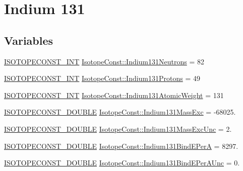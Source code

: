 \hypertarget{group___isotope_const-_indium-_in131}{}\section{Indium 131}
\label{group___isotope_const-_indium-_in131}
\subsection*{Variables}
\begin{DoxyCompactItemize}
\item 
\mbox{\hyperlink{group___isotope_const-_macros_ga5f18360b3e99483a35c32d789e62621c}{I\+S\+O\+T\+O\+P\+E\+C\+O\+N\+S\+T\+\_\+\+I\+NT}} \mbox{\hyperlink{group___isotope_const-_indium-_in131_ga2c5a13fe87f76c489cc000a4b09c2484}{Isotope\+Const\+::\+Indium131\+Neutrons}} = 82
\item 
\mbox{\hyperlink{group___isotope_const-_macros_ga5f18360b3e99483a35c32d789e62621c}{I\+S\+O\+T\+O\+P\+E\+C\+O\+N\+S\+T\+\_\+\+I\+NT}} \mbox{\hyperlink{group___isotope_const-_indium-_in131_gaac49eb7eaf3cd87a3bb5853c2b3e2609}{Isotope\+Const\+::\+Indium131\+Protons}} = 49
\item 
\mbox{\hyperlink{group___isotope_const-_macros_ga5f18360b3e99483a35c32d789e62621c}{I\+S\+O\+T\+O\+P\+E\+C\+O\+N\+S\+T\+\_\+\+I\+NT}} \mbox{\hyperlink{group___isotope_const-_indium-_in131_gaefaeeedf914614a83935a180375c573e}{Isotope\+Const\+::\+Indium131\+Atomic\+Weight}} = 131
\item 
\mbox{\hyperlink{group___isotope_const-_macros_ga8f45a7272ce02c0b4c65c44636ed719a}{I\+S\+O\+T\+O\+P\+E\+C\+O\+N\+S\+T\+\_\+\+D\+O\+U\+B\+LE}} \mbox{\hyperlink{group___isotope_const-_indium-_in131_ga5d6dfdd2ffacc1f60cddfd1ef940777c}{Isotope\+Const\+::\+Indium131\+Mass\+Exc}} = -\/68025.
\item 
\mbox{\hyperlink{group___isotope_const-_macros_ga8f45a7272ce02c0b4c65c44636ed719a}{I\+S\+O\+T\+O\+P\+E\+C\+O\+N\+S\+T\+\_\+\+D\+O\+U\+B\+LE}} \mbox{\hyperlink{group___isotope_const-_indium-_in131_ga4c2b98b7137a4b9ff07d3a1d0dfb30a7}{Isotope\+Const\+::\+Indium131\+Mass\+Exc\+Unc}} = 2.
\item 
\mbox{\hyperlink{group___isotope_const-_macros_ga8f45a7272ce02c0b4c65c44636ed719a}{I\+S\+O\+T\+O\+P\+E\+C\+O\+N\+S\+T\+\_\+\+D\+O\+U\+B\+LE}} \mbox{\hyperlink{group___isotope_const-_indium-_in131_ga31cc8c01bb78024ee0ba1ea59ac14f27}{Isotope\+Const\+::\+Indium131\+Bind\+E\+PerA}} = 8297.
\item 
\mbox{\hyperlink{group___isotope_const-_macros_ga8f45a7272ce02c0b4c65c44636ed719a}{I\+S\+O\+T\+O\+P\+E\+C\+O\+N\+S\+T\+\_\+\+D\+O\+U\+B\+LE}} \mbox{\hyperlink{group___isotope_const-_indium-_in131_gaf744cb907b79a51f830d072cad3fa54f}{Isotope\+Const\+::\+Indium131\+Bind\+E\+Per\+A\+Unc}} = 0.

\end{DoxyCompactItemize}
